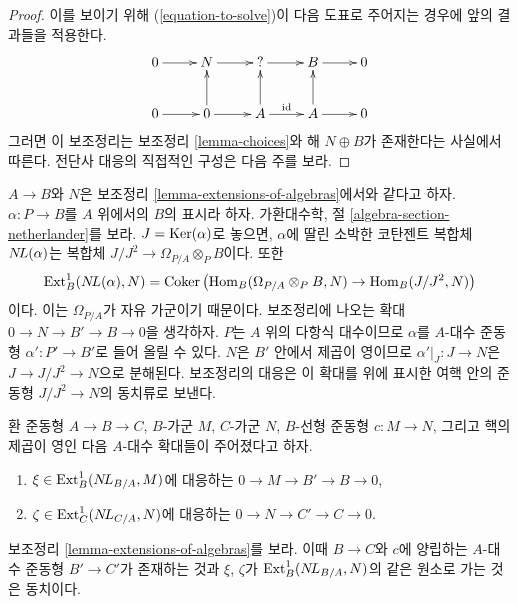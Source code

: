 \begin{proof}
이를 보이기 위해 (\ref{equation-to-solve})이 다음 도표로 주어지는 경우에
앞의 결과들을 적용한다.
$$
\xymatrix{
0 \ar[r] & N \ar[r] & {?} \ar[r] & B \ar[r] & 0 \\
0 \ar[r] & 0 \ar[u] \ar[r] & A \ar[u] \ar[r]^{\text{id}} & A \ar[u] \ar[r] & 0
}
$$
그러면 이 보조정리는 보조정리 \ref{lemma-choices}와 해 $N\oplus B$가
존재한다는 사실에서 따른다. 전단사 대응의 직접적인 구성은 다음 주를 보라.
\end{proof}

\begin{remark}
\label{remark-extensions-of-algebras}
$A\to B$와 $N$은 보조정리 \ref{lemma-extensions-of-algebras}에서와
같다고 하자. $\alpha:P\to B$를 $A$ 위에서의 $B$의 표시라 하자.
가환대수학, 절 \ref{algebra-section-netherlander}를 보라.
$J=\mathop{\mathrm{Ker}}(\alpha)$로 놓으면, $\alpha$에 딸린 소박한 코탄젠트 복합체
$\mathop{N\!L}\nolimits(\alpha)$는 복합체 $J/J^2\to\Omega_{P/A}\otimes_P B$이다. 또한
$$
\mathop{\mathrm{Ext}}\nolimits^1_B(\mathop{N\!L}\nolimits(\alpha), N) =
\mathop{\mathrm{Coker}}\left(\mathop{\mathrm{Hom}}\nolimits_B(\Omega_{P/A} \otimes_P B, N) \to \mathop{\mathrm{Hom}}\nolimits_B(J/J^2, N)\right)
$$
이다. 이는 $\Omega_{P/A}$가 자유 가군이기 때문이다. 보조정리에 나오는
확대 $0\to N\to B'\to B\to0$을 생각하자. $P$는 $A$ 위의 다항식
대수이므로 $\alpha$를 $A$-대수 준동형 $\alpha':P'\to B'$로
들어 올릴 수 있다. $N$은 $B'$ 안에서 제곱이 영이므로
$\alpha'|_J:J\to N$은 $J\to J/J^2\to N$으로 분해된다.
보조정리의 대응은 이 확대를 위에 표시한 여핵 안의 준동형
$J/J^2\to N$의 동치류로 보낸다.
\end{remark}

\begin{lemma}
\label{lemma-extensions-of-algebras-functorial}
환 준동형 $A\to B\to C$, $B$-가군 $M$, $C$-가군 $N$,
$B$-선형 준동형 $c:M\to N$, 그리고 핵의 제곱이 영인 다음
$A$-대수 확대들이 주어졌다고 하자.
\begin{enumerate}
\item[(a)] $\xi\in\mathop{\mathrm{Ext}}\nolimits^1_B(\mathop{N\!L}\nolimits_{B/A},M)$에 대응하는
$0\to M\to B'\to B\to0$,
\item[(b)] $\zeta\in\mathop{\mathrm{Ext}}\nolimits^1_C(\mathop{N\!L}\nolimits_{C/A},N)$에 대응하는
$0\to N\to C'\to C\to0$.
\end{enumerate}
보조정리 \ref{lemma-extensions-of-algebras}를 보라. 이때 $B\to C$와
$c$에 양립하는 $A$-대수 준동형 $B'\to C'$가 존재하는 것과
$\xi$, $\zeta$가 $\mathop{\mathrm{Ext}}\nolimits^1_B(\mathop{N\!L}\nolimits_{B/A},N)$의 같은 원소로 가는 것은
동치이다.
\end{lemma}

